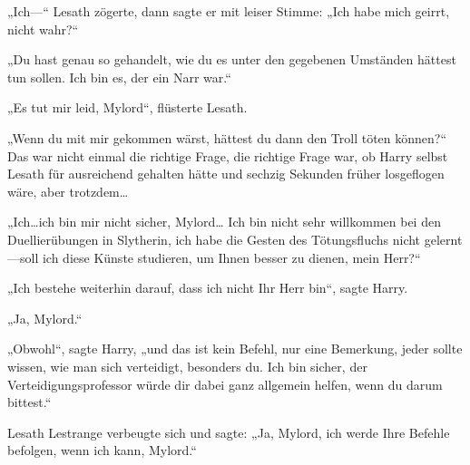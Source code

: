 „Ich—“ Lesath zögerte, dann sagte er mit leiser Stimme: „Ich habe mich geirrt, nicht wahr?“

„Du hast genau so gehandelt, wie du es unter den gegebenen Umständen hättest tun sollen. Ich bin es, der ein Narr war.“

„Es tut mir leid, Mylord“, flüsterte Lesath.

„Wenn du mit mir gekommen wärst, hättest du dann den Troll töten können?“
Das war nicht einmal die richtige Frage, die richtige Frage war, ob Harry selbst Lesath für ausreichend gehalten hätte und sechzig Sekunden früher losgeflogen wäre, aber trotzdem…

„Ich…ich bin mir nicht sicher, Mylord… Ich bin nicht sehr willkommen bei den Duellierübungen in Slytherin, ich habe die Gesten des Tötungsfluchs nicht gelernt—soll ich diese Künste studieren, um Ihnen besser zu dienen, mein Herr?“

„Ich bestehe weiterhin darauf, dass ich nicht Ihr Herr bin“, sagte Harry.

„Ja, Mylord.“

„Obwohl“, sagte Harry, „und das ist kein Befehl, nur eine Bemerkung, jeder sollte wissen, wie man sich verteidigt, besonders du. Ich bin sicher, der Verteidigungsprofessor würde dir dabei ganz allgemein helfen, wenn du darum bittest.“

Lesath Lestrange verbeugte sich und sagte: „Ja, Mylord, ich werde Ihre Befehle befolgen, wenn ich kann, Mylord.“

